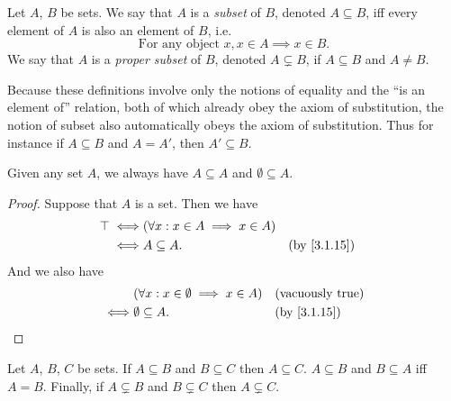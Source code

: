 \begin{defn}[Subsets]\label{3.1.15}
  Let \(A\), \(B\) be sets.
  We say that \(A\) is a \emph{subset} of \(B\), denoted \(A \subseteq B\), iff every element of \(A\) is also an element of \(B\), i.e.
  \[
    \text{For any object } x, x \in A \implies x \in B.
  \]
  We say that \(A\) is a \emph{proper subset} of \(B\), denoted \(A \subsetneq B\), if \(A \subseteq B\) and \(A \neq B\).
\end{defn}

\begin{rmk}\label{3.1.16}
  Because these definitions involve only the notions of equality and the ``is an element of'' relation, both of which already obey the axiom of substitution, the notion of subset also automatically obeys the axiom of substitution.
  Thus for instance if \(A \subseteq B\) and \(A = A'\), then \(A' \subseteq B\).
\end{rmk}

\begin{eg}\label{3.1.17}
  Given any set \(A\), we always have \(A \subseteq A\) and \(\emptyset \subseteq A\).
\end{eg}

\begin{proof}
  Suppose that \(A\) is a set.
  Then we have
  \begin{align*}
    \top \iff & (\forall x : x \in A \implies x \in A)                  \\
    \iff      & A \subseteq A.                         &  & \by{3.1.15}
  \end{align*}
  And we also have
  \begin{align*}
         & (\forall x : x \in \emptyset \implies x \in A) &  & \text{(vacuously true)} \\
    \iff & \emptyset \subseteq A.                         &  & \by{3.1.15}
  \end{align*}
\end{proof}

\begin{prop}\label{3.1.18}
  Let \(A\), \(B\), \(C\) be sets.
  If \(A \subseteq B\) and \(B \subseteq C\) then \(A \subseteq C\).
  \(A \subseteq B\) and \(B \subseteq A\) iff \(A = B\).
  Finally, if \(A \subsetneq B\) and \(B \subsetneq C\) then \(A \subsetneq C\).
\end{prop}

